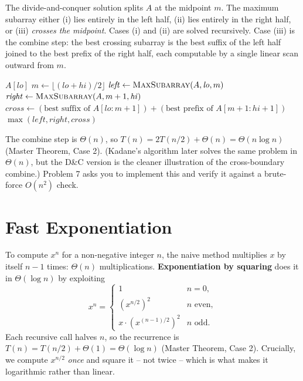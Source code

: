 \documentclass[11pt]{article}
\begin{document}
The divide-and-conquer solution splits $A$ at the midpoint $m$. The maximum subarray either
(i) lies entirely in the left half, (ii) lies entirely in the right half, or (iii)
\emph{crosses the midpoint}. Cases (i) and (ii) are solved recursively. Case (iii) is the
combine step: the best crossing subarray is the best suffix of the left half joined to the
best prefix of the right half, each computable by a single linear scan outward from $m$.

\begin{algorithm}[h]
\caption{Maximum subarray (divide and conquer)}
\begin{algorithmic}[1]
     \State \Return $A[\mathit{lo}]$ \EndIf
    \State $m \gets \lfloor (\mathit{lo} + \mathit{hi})/2 \rfloor$
    \State $\mathit{left} \gets \Call{MaxSubarray}{A, \mathit{lo}, m}$
    \State $\mathit{right} \gets \Call{MaxSubarray}{A, m+1, \mathit{hi}}$
    \State $\mathit{cross} \gets (\text{best suffix of } A[\mathit{lo}\mathbin{:}m{+}1]) + (\text{best prefix of } A[m{+}1\mathbin{:}\mathit{hi}{+}1])$
    \State \Return $\max(\mathit{left}, \mathit{right}, \mathit{cross})$
\EndFunction
\end{algorithmic}
\end{algorithm}

The combine step is $\Theta(n)$, so $T(n) = 2T(n/2) + \Theta(n) = \Theta(n \log n)$ (Master
Theorem, Case 2). (Kadane's algorithm later solves the same problem in $\Theta(n)$, but the
D\&C version is the cleaner illustration of the cross-boundary combine.) Problem 7 asks you
to implement this and verify it against a brute-force $O(n^2)$ check.

\section{Fast Exponentiation}

To compute $x^n$ for a non-negative integer $n$, the naive method multiplies $x$ by itself
$n-1$ times: $\Theta(n)$ multiplications. \textbf{Exponentiation by squaring} does it in
$\Theta(\log n)$ by exploiting
\[
    x^n = \begin{cases}
        1 & n = 0, \\
        (x^{n/2})^2 & n \text{ even}, \\
        x \cdot (x^{(n-1)/2})^2 & n \text{ odd}.
    \end{cases}
\]
Each recursive call halves $n$, so the recurrence is $T(n) = T(n/2) + \Theta(1) =
\Theta(\log n)$ (Master Theorem, Case 2). Crucially, we compute $x^{n/2}$ \emph{once} and
square it -- not twice -- which is what makes it logarithmic rather than linear.
\end{document}
